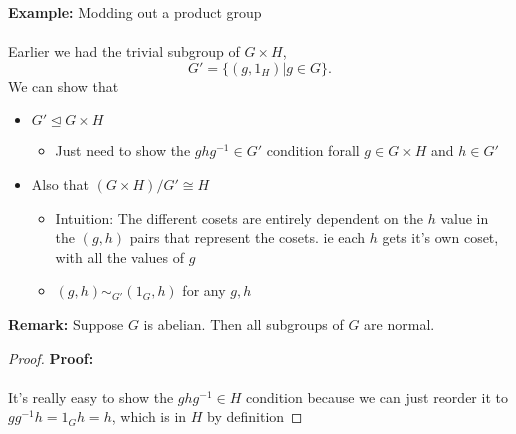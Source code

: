 \documentclass{article}
\begin{document}
\begin{example} 
\textbf{Example:} Modding out a product group \\
~\\
Earlier we had the trivial subgroup of $G \times H$,
\[
	G' = \{(g,1_H) | g\in G\}
.\]
We can show that
\begin{itemize}
	\item $G' \trianglelefteq G \times H$
	\begin{itemize}
		\item Just need to show the $ghg^{-1} \in G'$ condition forall $g\in G\times H$ and $h\in G'$
	\end{itemize}
	\item Also that $(G\times H) /G' \cong H$
	\begin{itemize}
		\item Intuition: The different cosets are entirely dependent on the $h$ value in the $(g,h)$ pairs that represent the cosets. ie each $h$ gets it's own coset, with all the values of $g$
		\item $(g,h) \sim _{G'} (1_G,h)$ for any $g,h$
	\end{itemize}
\end{itemize}
\end{example}
\begin{remark} 
\textbf{Remark:} Suppose $G$ is abelian. Then all subgroups of $G$ are normal.
\begin{proof} 
\textbf{Proof:} \\
~\\
It's really easy to show the $ghg^{-1} \in H$ condition because we can just reorder it to $gg^{-1}h = 1_Gh = h$, which is in $H$ by definition
\end{proof}
\end{remark}
\end{document}
